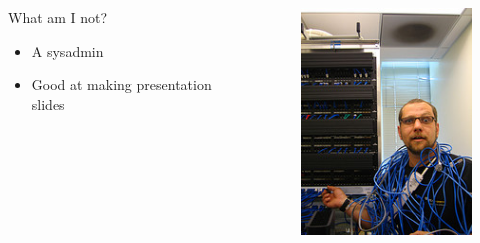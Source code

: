 \documentclass{beamer}
\begin{document}
\begin{frame}
    \begin{columns}
        \begin{column}{0.5\textwidth}
            What am I not? 
            \begin{itemize}
                \item A sysadmin
                \item Good at making presentation slides
            \end{itemize}
        \end{column}
        \begin{column}{0.5\textwidth}
            \begin{figure}
                \centering
                \includegraphics[width=\textwidth,keepaspectratio]{../resources/sysadmin.jpg}
            \end{figure}
        \end{column}
    \end{columns}
\end{frame}
\end{document}
